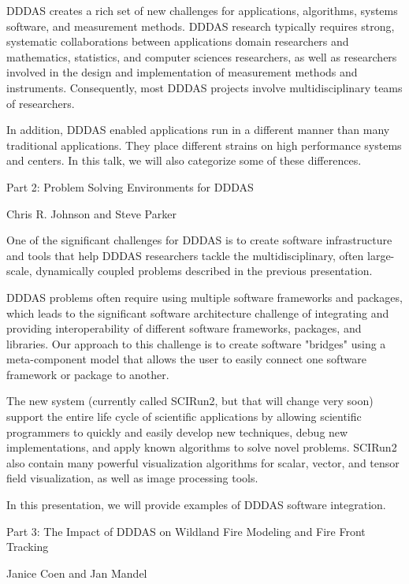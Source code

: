\documentclass{report}
\begin{document}
DDDAS creates a rich set of new challenges for applications, algorithms,
systems software, and measurement methods. DDDAS research typically
requires strong, systematic collaborations between applications domain
researchers and mathematics, statistics, and computer sciences
researchers, as well as researchers involved in the design and
implementation of measurement methods and instruments. Consequently, most
DDDAS projects involve multidisciplinary teams of researchers.

In addition, DDDAS enabled applications run in a different manner than
many traditional applications. They place different strains on high
performance systems and centers. In this talk, we will also categorize
some of these differences.


Part 2: Problem Solving Environments for DDDAS

Chris R. Johnson and Steve Parker

One of the significant challenges for DDDAS is to create software
infrastructure and tools that help DDDAS researchers tackle the
multidisciplinary, often large-scale, dynamically coupled problems
described in the previous presentation.

DDDAS problems often require using multiple software frameworks and
packages, which leads to the significant software architecture challenge
of integrating and providing interoperability of different software
frameworks, packages, and libraries. Our approach to this challenge is to
create software "bridges" using a meta-component model that allows the
user to easily connect one software framework or package to another.

The new system (currently called SCIRun2, but that will change very soon)
support the entire life cycle of scientific applications by allowing
scientific programmers to quickly and easily develop new techniques,
debug new implementations, and apply known algorithms to solve novel
problems. SCIRun2 also contain many powerful visualization algorithms for
scalar, vector, and tensor field visualization, as well as image
processing tools.

In this presentation, we will provide examples of DDDAS software integration.


Part 3: The Impact of DDDAS on Wildland Fire Modeling and Fire Front Tracking

Janice Coen and Jan Mandel
\end{document}
